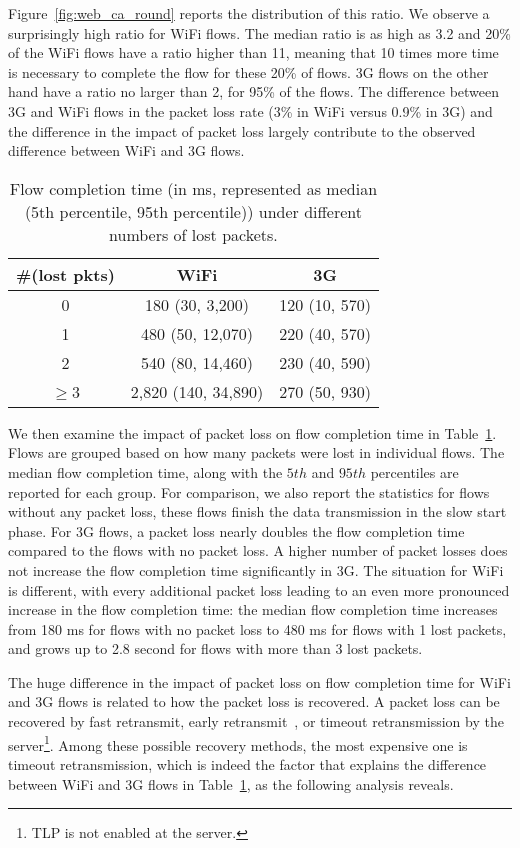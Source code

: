 Figure~\ref{fig:web_ca_round} reports the distribution of this ratio. We observe a surprisingly high ratio for WiFi flows. The median ratio is as high as 3.2 and 20\% of the WiFi flows have a ratio higher than 11, meaning that 10 times more time is necessary to complete the flow for these 20\% of flows. 3G flows on the other hand have a ratio no larger than 2, for 95\% of the flows. The difference between 3G and WiFi flows in the packet loss rate (3\% in WiFi versus 0.9\% in 3G) and the difference in the impact of packet loss largely contribute to the observed difference between WiFi and 3G flows.

\begin{table}[th]
\caption{Flow completion time (in ms, represented as median (5th percentile, 95th percentile)) under different numbers of lost packets.}
\label{tab:web_loss_finish_time}
\centering
\renewcommand{\arraystretch}{1.0}
\begin{tabular}{c|c|c}
\hline
\#(lost pkts) & WiFi & 3G\\
\hline
0 & 180 (30, 3,200) & 120 (10, 570) \\
%
1 & 480 (50, 12,070) & 220 (40, 570) \\
%
2 & 540 (80, 14,460) & 230 (40, 590) \\
%
$\ge$3 & 2,820 (140, 34,890) & 270 (50, 930) \\
\hline
\end{tabular}
\minsqueeze
\end{table}

We then examine the impact of packet loss on flow completion time in Table~\ref{tab:web_loss_finish_time}. Flows are grouped based on how many packets were lost in individual flows. The median flow completion time, along with the $5th$ and $95th$ percentiles are reported for each group. For comparison, we also report the statistics for flows without any packet loss, \ie these flows finish the data transmission in the slow start phase. For 3G flows, a packet loss nearly doubles the flow completion time compared to the flows with no packet loss. A higher number of packet losses does not increase the flow completion time significantly in 3G. The situation for WiFi is different, with every additional packet loss leading to an even more pronounced increase in the flow completion time: the median flow completion time increases from 180 ms for flows with no packet loss to 480 ms for flows with 1 lost packets, and grows up to 2.8 second for flows with more than 3 lost packets. 

The huge difference in the impact of packet loss on flow completion time for WiFi and 3G flows is related to how the packet loss is recovered. A packet loss can be recovered by fast retransmit, early retransmit~\cite{rfc5827}, or timeout retransmission by the server\footnote{TLP \cite{flach2013reducing} is not enabled at the server.}. Among these possible recovery methods, the most expensive one is timeout retransmission, which is indeed the factor that explains the difference between WiFi and 3G flows in Table~\ref{tab:web_loss_finish_time}, as the following analysis reveals.

